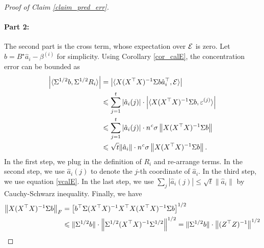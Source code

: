 \begin{proof}[Proof of Claim \ref{claim_pred_err}]
	\paragraph{Part 2:} The second part is the cross term, whose expectation over $\mathcal{E}$ is zero.
	Let $b = B^{\star} \hat{a}_i - \beta^{(i)}$ for simplicity.
	Using Corollary \ref{cor_calE}, the concentration error can be bounded as
	\begin{align*}
		{\left| {\langle \Sigma^{1/2}b, \Sigma^{1/2}R_i \rangle} \right|}
		&= {\left| {\langle X (X^{\top}X)^{-1} \Sigma b \hat{a}_i^{\top}, \mathcal{E} \rangle} \right|} \\
		&\leqslant \sum_{j=1}^t \left\lvert\hat{a}_i(j)\right\rvert \cdot {\left| {\langle X (X^{\top} X)^{-1} \Sigma b, \varepsilon^{(j)} \rangle} \right|} \\
		&\leqslant \sum_{j=1}^t \left\lvert\hat{a}_i(j)\right\rvert \cdot n^{{\mathit{c}}}\sigma \left\| X (X^{\top}X)^{-1} \Sigma b \right\| \\
		&\leqslant \sqrt{t} \|\hat{a}_i\| \cdot n^{{\mathit{c}}} \sigma \left\| X (X^{\top} X)^{-1} \Sigma b \right\|.
	\end{align*}
	In the first step, we plug in the definition of $R_i$ and re-arrange terms.
	In the second step, we use $\hat{a}_i(j)$ to denote the $j$-th coordinate of $\hat{a}_i$.
	In the third step, we use equation \eqref{vcalE}.
	In the last step, we use $\sum_j |\hat a_i(j)|\le \sqrt{t}\|\hat a_i\|$ by Cauchy-Schwarz inequality.
	Finally, we have
	\begin{align*}
		\bignormFro{ X(X^\top X)^{-1}\Sigma b} &=\left[ {b}^\top \Sigma (X^\top X)^{-1}X^\top X(X^\top X)^{-1}\Sigma b \right]^{1/2} \\
		&\le  \|\Sigma^{1/2} b \|  \cdot \left\| \Sigma^{1/2}(X^\top X)^{-1}\Sigma ^{1/2} \right\|^{1/2}  =   \|\Sigma^{1/2} b \|  \cdot \left\| (Z^\top Z)^{-1}\right\|^{1/2} \\

\end{align*}
\end{proof}
